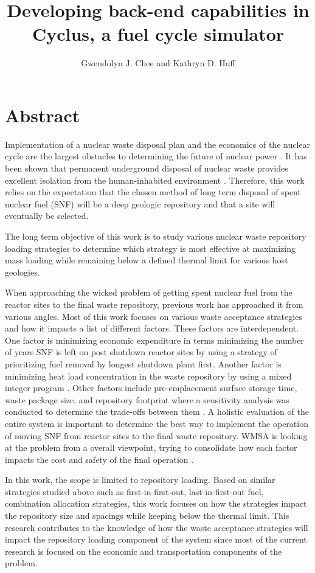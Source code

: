 \documentclass{anstrans}
\title{Developing back-end capabilities in Cyclus, a fuel cycle simulator}
\author{Gwendolyn J. Chee and Kathryn D. Huff}
\institute{
Dept. of Nuclear, Plasma and Radiological Engineering, University of Illinois at Urbana-Champaign \\
gchee2@illinois.edu
}
\begin{document}
\section{Abstract}
Implementation of a nuclear waste disposal plan and the economics of the nuclear 
cycle are the largest obstacles to determining the future of nuclear power 
\cite{massachusetts_institute_of_technology_future_2003}. 
It has been shown that permanent underground disposal of nuclear waste provides 
excellent isolation from the human-inhabited environment 
\cite{rechard_evolution_2014}. 
Therefore, this work relies on the expectation that the chosen method of long 
term disposal of spent nuclear fuel (SNF) will be a deep geologic repository 
and that a site will eventually be selected.

The long term objective of this work is to study various nuclear waste repository 
loading strategies to determine which strategy is most effective at maximizing 
mass loading while remaining below a defined thermal limit for various host 
geologies. 

When approaching the wicked problem of getting spent nuclear fuel from the reactor 
sites to the final waste repository, previous work has approached it from various 
angles. 
Most of this work focuses on various waste acceptance strategies and how it 
impacts a list of different factors. 
These factors are interdependent. 
One factor is minimizing economic expenditure in terms minimizing the number 
of years SNF is left on post shutdown reactor sites by using a strategy of 
prioritizing fuel removal by longest shutdown plant first\cite{nesbit_proposed_2015}. 
Another factor is minimizing heat load concentration in the waste repository by 
using a mixed integer program \cite{johnson_optimizing_2016}. Other factors 
include pre-emplacement surface storage time, waste package size, and repository 
footprint where a sensitivity analysis was conducted to determine the trade-offs 
between them \cite{greenberg_application_2012}. 
A holistic evaluation of the entire system is important to determine the best 
way to implement the operation of moving SNF from reactor sites to the final 
waste repository. 
WMSA is looking at the problem from a overall viewpoint, trying to consolidate 
how each factor impacts the cost and safety of the final operation 
\cite{nutt_waste_2015}. 

In this work, the scope is limited to repository loading. 
Based on similar strategies studied above such as first-in-first-out, 
last-in-first-out fuel, combination allocation strategies, this work focuses
 on how the strategies impact the repository size and spacings while keeping 
 below the thermal limit. 
 This research contributes to the knowledge of how the waste acceptance 
 strategies will impact the repository loading component of the system since 
 most of the current research is focused on the economic and transportation 
 components of the problem. 
\end{document}
